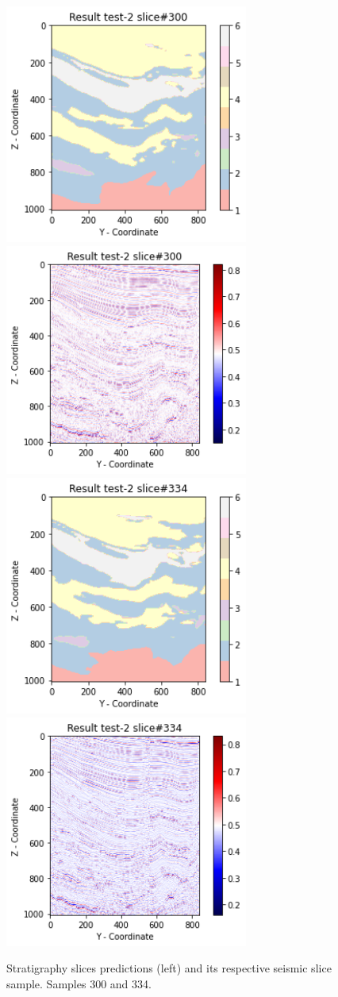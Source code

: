 \documentclass[twoside,letterpaper,twocolumn]{article}
\begin{document}
\begin{figure}[ht!]
	\centering
	\includegraphics[width=8cm]{Figures/predict300.png}
	\includegraphics[width=8cm]{Figures/seismic300.png}
	\includegraphics[width=8cm]{Figures/predict334.png}
	\includegraphics[width=8cm]{Figures/seismic334.png}
	
	\caption{Stratigraphy slices predictions (left) and its respective seismic slice sample. Samples 300 and 334.}
	\label{fig:predict_part2}
\end{figure}
\end{document}
